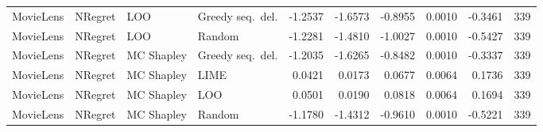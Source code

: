 \begin{longtable}{@{}p{}p{}p{}p{}rrrrrr@{}}
MovieLens & NRegret & LOO & Greedy seq.\ del. & -1.2537 & -1.6573 & -0.8955 & 0.0010 & -0.3461 & 339 \\
MovieLens & NRegret & LOO & Random & -1.2281 & -1.4810 & -1.0027 & 0.0010 & -0.5427 & 339 \\
MovieLens & NRegret & MC Shapley & Greedy seq.\ del. & -1.2035 & -1.6265 & -0.8482 & 0.0010 & -0.3337 & 339 \\
MovieLens & NRegret & MC Shapley & LIME & 0.0421 & 0.0173 & 0.0677 & 0.0064 & 0.1736 & 339 \\
MovieLens & NRegret & MC Shapley & LOO & 0.0501 & 0.0190 & 0.0818 & 0.0064 & 0.1694 & 339 \\
MovieLens & NRegret & MC Shapley & Random & -1.1780 & -1.4312 & -0.9610 & 0.0010 & -0.5221 & 339 \\
\end{longtable}